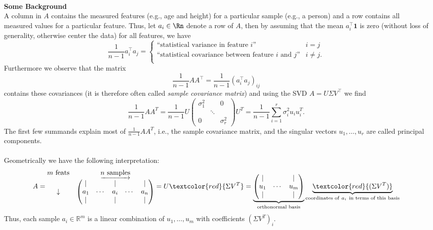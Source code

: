{\color{navy}
	~\\
	\textbf{Some Background}\\
A column in $A$ contains the measured features (e.g., age and height) for a particular sample (e.g., a person) and a row contains all measured values for a particular feature. Thus, let $a_i \in \Rn$ denote a row of $A$, then by assuming that the mean $a_i^\top \mathbf{1}$ is zero (without loss of generality, otherwise center the data) for all features, we have
$$\frac{1}{n-1}a_i^\top a_j = \begin{cases}
\text{``statistical variance in feature $i$''} & i=j\\
\text{``statistical covariance between feature $i$ and $j$''} & i\neq j.\\
\end{cases}$$
Furthermore we observe that the matrix $$\frac{1}{n-1} AA^\top = \frac{1}{n-1}\left(a_i^\top a_j\right)_{ij} $$ contains these covariances (it is therefore often called \textit{sample covariance matrix}) and using the SVD $A=U\Sigma V^\top$ we find
$$
\frac{1}{n-1}AA^T=\frac{1}{n-1}U\begin{pmatrix}
\sigma_1^2&~&0\\~&\ddots&~\\0&~&\sigma_r^2
\end{pmatrix}U^T=\frac{1}{n-1}\sum_{i=1}^r \sigma_i^2u_iu_i^T.
$$
The first few summands explain most of $\frac{1}{n-1}AA^T$, i.e., the sample covariance matrix, and the singular vectors $u_1,\dots,u_r$ are called principal components.\\~\\
Geometrically we have the following interpretation:
$$
A=\begin{matrix}
m~\text{feats}&\underrightarrow{n~\text{samples}}\\
\downarrow&\begin{pmatrix}
|&~&|&~&|\\
a_1&\cdots&a_i&\cdots&a_n\\
|&~&|&~&|
\end{pmatrix}
\end{matrix}
=U\textcolor{red}{\Sigma V^T}
=\underbrace{\begin{pmatrix}
	|&~&|\\u_1&\cdots&u_m\\|&~&|
	\end{pmatrix}}_{\text{orthonormal basis}}
\underbrace{\textcolor{red}{(\Sigma V^T)}}_{\text{coordinates of}~a_i~\text{in terms of this basis}}
$$
Thus, each sample $a_i\in\mathbb{R}^m$ is a linear combination of $u_1,\dots,u_m$ with coefficients $(\Sigma V^T)_i$.\\~\\
}
